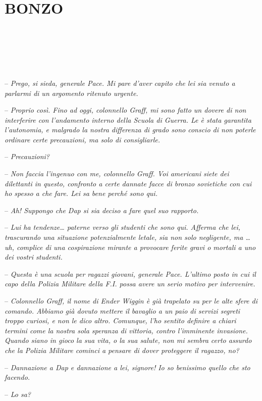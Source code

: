 \chapter{BONZO}

{~}

{~}

{~}

{-- \emph{Prego, si sieda, generale Pace. Mi pare d'aver capito che lei
		sia venuto a parlarmi di un argomento ritenuto urgente.}}

{-- \emph{Proprio così. Fino ad oggi, colonnello Graff, mi sono fatto un
		dovere di non interferire con l'andamento interno della Scuola di
		Guerra. Le è stata garantita l'autonomia, e malgrado la nostra
		differenza di grado sono conscio di non poterle ordinare certe
		precauzioni, ma solo di consigliarle.}}

{-- \emph{Precauzioni?}}

{-- \emph{Non faccia l'ingenuo con me, colonnello Graff. Voi americani
		siete dei dilettanti in questo, confronto a certe dannate facce di
		bronzo sovietiche con cui ho spesso a che fare. Lei sa bene perché sono
		qui.}}

{-- \emph{Ah! Suppongo che Dap si sia deciso a fare quel suo rapporto.}}

{-- \emph{Lui ha tendenze\ldots{} paterne verso gli studenti che sono
		qui. Afferma che lei, trascurando una situazione potenzialmente letale,
		sia non solo negligente, ma \ldots uh, complice di una cospirazione
		mirante a provocare ferite gravi o mortali a uno dei vostri studenti.}}

{-- \emph{Questa è una scuola per ragazzi giovani, generale Pace.
		L'ultimo posto in cui il capo della Polizia Militare della F.I. possa
		avere un serio motivo per intervenire.}}

{-- \emph{Colonnello Graff, il nome di Ender Wiggin è già trapelato su
		per le alte sfere di comando. Abbiamo già dovuto mettere il bavaglio a
		un paio di servizi segreti troppo curiosi, e non le dico altro.
		Comunque, l'ho sentito definire a chiari termini come la nostra sola
		speranza di vittoria, contro l'imminente invasione. Quando siano in
		gioco la sua vita, o la sua salute, non mi sembra certo assurdo che la
		Polizia Militare cominci a pensare di dover proteggere il ragazzo, no?}}

{-- \emph{Dannazione a Dap e dannazione a lei, signore! Io so benissimo
		quello che sto facendo.}}

{-- \emph{Lo sa?}}

